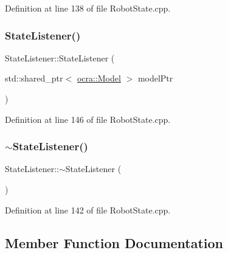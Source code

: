 Definition at line 138 of file Robot\+State.\+cpp.

\hypertarget{classocra__recipes_1_1StateListener_a6861fabf2b226ce71ba2bcfa766a4538}{}\label{classocra__recipes_1_1StateListener_a6861fabf2b226ce71ba2bcfa766a4538} 
\subsubsection{\texorpdfstring{State\+Listener()}{StateListener()}\hspace{0.1cm}{\footnotesize\ttfamily [2/2]}}
{\footnotesize\ttfamily State\+Listener\+::\+State\+Listener (\begin{DoxyParamCaption}\item[{std\+::shared\+\_\+ptr$<$ \hyperlink{classocra_1_1Model}{ocra\+::\+Model} $>$}]{model\+Ptr }\end{DoxyParamCaption})}



Definition at line 146 of file Robot\+State.\+cpp.

\hypertarget{classocra__recipes_1_1StateListener_a84961512f9533cc039ca2deefbabbb73}{}\label{classocra__recipes_1_1StateListener_a84961512f9533cc039ca2deefbabbb73} 
\subsubsection{\texorpdfstring{$\sim$\+State\+Listener()}{~StateListener()}}
{\footnotesize\ttfamily State\+Listener\+::$\sim$\+State\+Listener (\begin{DoxyParamCaption}{ }\end{DoxyParamCaption})\hspace{0.3cm}{\ttfamily [virtual]}}



Definition at line 142 of file Robot\+State.\+cpp.



\subsection{Member Function Documentation}
\hypertarget{classocra__recipes_1_1StateListener_a10196cebd253c4b98fb39371c95cc68a}{}\label{classocra__recipes_1_1StateListener_a10196cebd253c4b98fb39371c95cc68a} 
